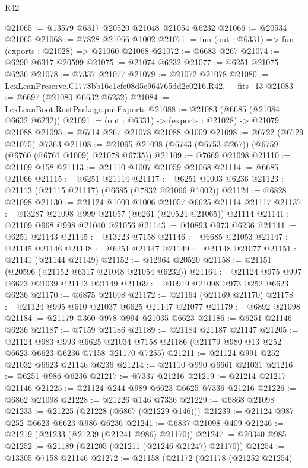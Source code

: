 \begin{lexlean}{R42}
\begin{coremodule}
{@21065 := @13579 @6317 @20520 @21048 @21054 @6232
@21066 := @20534 @21065
@21068 := @7828 @21066 @1002
@21071 := fun (out : @6331) => fun (exports : @21028) => @21060 @21068
@21072 := @6683 @267
@21074 := @6290 @6317 @20599
@21075 := @21074 @6232
@21077 := @6251 @21075 @6236
@21078 := @7337 @21077
@21079 := @21072 @21078
@21080 := LexLeanPreserve.C1778bb16c1cfe08d5e964765dd2c0216.R42.__fits_13
@21083 := @6697 (@21080 @6632 @6232)
@21084 := LexLeanBoot.RustPackage.putExports
@21088 := @21083 (@6685 (@21084 @6632 @6232))
@21091 := (out : @6331) -> (exports : @21028) -> @21079 @21088
@21095 := @6714 @267 @21078 @21088 @1009
@21098 := @6722 (@6729 @21075) @7363
@21108 := @21095 @21098 (@6743 (@6753 @267)) (@6759 (@6760 (@6761 @1009) @21078 @6735))
@21109 := @7669 @21098
@21110 := @21109 @158
@21113 := @21110 @1007 @21059 @21068
@21114 := @6685 @21066
@21115 := @6251 @21114
@21117 := @6251 @1003 @6236
@21123 := @21113 (@21115 @21117) (@6685 (@7832 @21066 @1002))
@21124 := @6828 @21098
@21130 := @21124 @1000 @1006 @21057 @6625 @21114 @21117
@21137 := @13287 @21098 @999 @21057 (@6261 (@20524 @21065)) @21114
@21141 := @21109 @968 @998 @21040 @21056
@21143 := @10893 @973 @6236
@21144 := @6251 @21143
@21145 := @13223 @7158
@21146 := @6685 @21053
@21147 := @21145 @21146
@21148 := @6251 @21147
@21149 := @21148 @21077
@21151 := @21141 (@21144 @21149)
@21152 := @12964 @20520
@21158 := @21151 (@20596 (@21152 @6317 @21048 @21054 @6232))
@21164 := @21124 @975 @997 @6623 @21039 @21143 @21149
@21169 := @10919 @21098 @973 @252 @6623 @6236
@21170 := @6875 @21098
@21172 := @21164 (@21169 @21170)
@21178 := @21124 @995 @610 @21037 @6625 @21147 @21077
@21179 := @6892 @21098
@21184 := @21179 @360 @978 @994 @21035 @6623
@21186 := @6251 @21146 @6236
@21187 := @7159 @21186
@21189 := @21184 @21187 @21147
@21205 := @21124
    @983
    @993
    @6625
    @21034
    @7158
    @21186
    (@21179 @980 @13 @252 @6623 @6623 @6236 @7158 @21170 @7255)
@21211 := @21124 @991 @252 @21032 @6623 @21146 @6236
@21214 := @21110 @990 @6661 @21031
@21216 := @6251 @986 @6236
@21217 := @7337 @21216
@21219 := @21214 @21217 @21146
@21225 := @21124 @244 @989 @6623 @6625 @7336 @21216
@21226 := @6862 @21098
@21228 := @21226 @146 @7336
@21229 := @6868 @21098
@21233 := @21225 (@21228 (@6867 (@21229 @146)))
@21239 := @21124 @987 @252 @6623 @6623 @986 @6236
@21241 := @6837 @21098 @409
@21246 := @21219 (@21233 (@21239 (@21241 @986) @21170))
@21247 := @20340 @985
@21252 := @21189 (@21205 (@21211 (@21246 @21247) @21170))
@21254 := @13305 @7158 @21146
@21272 := @21158
    (@21172
      (@21178
        (@21252 @21254)
}
\end{coremodule}
\end{lexlean}
